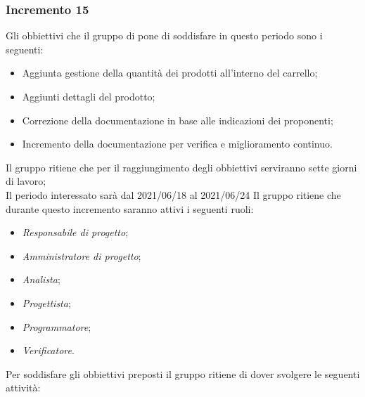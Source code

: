 
\subsubsection{Incremento 15}
Gli obbiettivi che il gruppo di pone di soddisfare in questo periodo sono i seguenti:
\begin{itemize}
    \item Aggiunta gestione della quantità dei prodotti all'interno del carrello;
    \item Aggiunti dettagli del prodotto;
    \item Correzione della documentazione in base alle indicazioni dei proponenti;
    \item Incremento della documentazione per verifica e miglioramento continuo.
\end{itemize}
Il gruppo ritiene che per il raggiungimento degli obbiettivi serviranno sette giorni di lavoro;\\
Il periodo interessato sarà dal 2021/06/18 al 2021/06/24
Il gruppo ritiene che durante questo incremento saranno attivi i seguenti ruoli:
\begin{itemize}
    \item \textit{Responsabile di progetto};
    \item \textit{Amministratore di progetto};
    \item \textit{Analista};
    \item \textit{Progettista};
    \item \textit{Programmatore};
    \item \textit{Verificatore}.
\end{itemize}
Per soddisfare gli obbiettivi preposti il gruppo ritiene di dover svolgere le seguenti attività:
